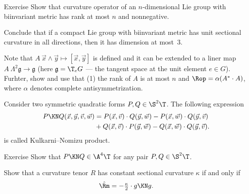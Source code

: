 




\begin{thm}{Exercise}\label{ex:Rop-Li}
Show that curvature operator of an $n$-dimensional Lie group with biinvariant metric has rank at most $n$ and nonnegative.

Conclude that if a compact Lie group with biinvariant metric has unit sectional curvature in all directions, then it has dimension at most~3.
\end{thm}

 Note that  $A\:\vec x\wedge \vec y\mapsto [\vec x,\vec y]$ is defined and it can be extended to a liner map $A\:\Lambda^2\mathfrak{g}\to\mathfrak{g}$ (here $\mathfrak{g}=\T_eG$ --- the tangent space at the unit element $e\in G$).
Furhter, show and use that (1) the rank of $A$ is at most $n$ and $\Rop =\alpha(A^*\cdot A)$, where $\alpha$ denotes complete antisymmetrization.


















Consider two symmetric quadratic forms $P,Q\in\S^2\T$.
The following expression 
\begin{align*}
P\KN Q(\vec x,\vec y,\vec v,\vec w)
&=
P(\vec x,\vec v)\cdot Q(\vec y,\vec w)-P(\vec x,\vec w)\cdot Q(\vec y,\vec v)\\
&+Q(\vec x,\vec v)\cdot P(\vec y,\vec w)-Q(\vec x,\vec w)\cdot Q(\vec y,\vec v).
\end{align*}
is called Kulkarni--Nomizu product.

\begin{thm}{Exercise}
Show that $P\KN Q\in \A^4\T$ for any pair  $P,Q\in\S^2\T$.

Show that a curvature tenor $R$ has constant sectional curvature $\kappa$ if and only if 
\[\hat \Rm=-\tfrac\kappa2\cdot g\KN g.\]
\end{thm}
